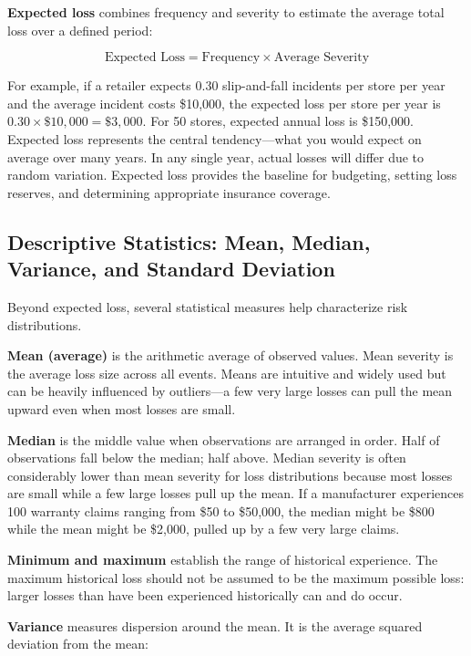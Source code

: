 \documentclass[11pt,openany]{book}
\begin{document}
\textbf{Expected loss} combines frequency and severity to estimate the average
total loss over a defined period:

\[
  \text{Expected Loss} = \text{Frequency} \times \text{Average Severity}
\]

For example, if a retailer expects 0.30 slip-and-fall incidents per store per
year and the average incident costs \$10,000, the expected loss per store per
year is \(0.30 \times \$10{,}000 = \$3{,}000\). For 50 stores, expected annual
loss is \$150,000. Expected loss represents the central tendency---what you
would expect on average over many years. In any single year, actual losses will
differ due to random variation. Expected loss provides the baseline for
budgeting, setting loss reserves, and determining appropriate insurance
coverage.

\subsection{Descriptive Statistics: Mean, Median, Variance, and Standard Deviation}
\label{subsec:descriptive-stats}

Beyond expected loss, several statistical measures help characterize risk
distributions.

\textbf{Mean (average)} is the arithmetic average of observed values. Mean
severity is the average loss size across all events. Means are intuitive and
widely used but can be heavily influenced by outliers---a few very large losses
can pull the mean upward even when most losses are small.

\textbf{Median} is the middle value when observations are arranged in order.
Half of observations fall below the median; half above. Median severity is
often considerably lower than mean severity for loss distributions because most
losses are small while a few large losses pull up the mean. If a manufacturer
experiences 100 warranty claims ranging from \$50 to \$50,000, the median might
be \$800 while the mean might be \$2,000, pulled up by a few very large claims.

\textbf{Minimum and maximum} establish the range of historical experience. The
maximum historical loss should not be assumed to be the maximum possible loss:
larger losses than have been experienced historically can and do occur.

\textbf{Variance} measures dispersion around the mean. It is the average squared
deviation from the mean:
\end{document}
